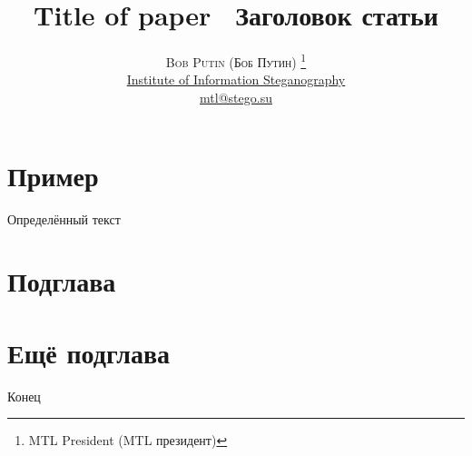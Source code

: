 \documentclass[twoside]{article}
\title{\vspace{-15mm}\fontsize{24pt}{10pt}\selectfont\textbf{
        Title of paper \ Заголовок статьи
    }} %
\author{
        \large
        \textsc{ Bob Putin (Боб Путин) }\thanks{MTL President (MTL президент)}\\[2mm] %
        \normalsize \href{ iis.stego.su  }{ Institute of Information Steganography } \\ %
        \normalsize \href{mailto: mtl@stego.su }{mtl@stego.su} %
        \vspace{-5mm}
    }
\date{}
\begin{document}
\maketitle
\section{Пример}

Определённый текст

\section{Подглава}


\section{Ещё подглава}


Конец
\end{document}
